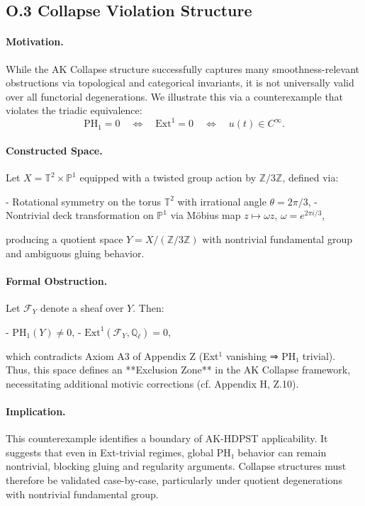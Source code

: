 \documentclass[11pt]{article}
\begin{document}
\begin{axiom}
\begin{axiom}
{{\subsection*{O.3 Collapse Violation Structure}

\paragraph{Motivation.}
While the AK Collapse structure successfully captures many smoothness-relevant obstructions via topological and categorical invariants, it is not universally valid over all functorial degenerations. We illustrate this via a counterexample that violates the triadic equivalence:  
\[
\mathrm{PH}_1 = 0 \quad \Leftrightarrow \quad \mathrm{Ext}^1 = 0 \quad \Leftrightarrow \quad u(t) \in C^\infty.
\]

\paragraph{Constructed Space.}
Let \( X = \mathbb{T}^2 \times \mathbb{P}^1 \) equipped with a twisted group action by \( \mathbb{Z}/3\mathbb{Z} \), defined via:

- Rotational symmetry on the torus \( \mathbb{T}^2 \) with irrational angle \( \theta = 2\pi/3 \),
- Nontrivial deck transformation on \( \mathbb{P}^1 \) via Möbius map \( z \mapsto \omega z \), \( \omega = e^{2\pi i/3} \),

producing a quotient space \( Y = X / (\mathbb{Z}/3\mathbb{Z}) \) with nontrivial fundamental group and ambiguous gluing behavior.

\paragraph{Formal Obstruction.}
Let \( \mathcal{F}_Y \) denote a sheaf over \( Y \). Then:

- \( \mathrm{PH}_1(Y) \neq 0 \),
- \( \mathrm{Ext}^1(\mathcal{F}_Y, \mathbb{Q}_\ell) = 0 \),

which contradicts Axiom A3 of Appendix Z (Ext$^1$ vanishing ⇒ PH₁ trivial).  
Thus, this space defines an **Exclusion Zone** in the AK Collapse framework, necessitating additional motivic corrections (cf. Appendix H, Z.10).

\paragraph{Implication.}
This counterexample identifies a boundary of AK-HDPST applicability. It suggests that even in Ext-trivial regimes, global PH₁ behavior can remain nontrivial, blocking gluing and regularity arguments. Collapse structures must therefore be validated case-by-case, particularly under quotient degenerations with nontrivial fundamental group.


}}
\end{axiom}
\end{axiom}
\end{document}
